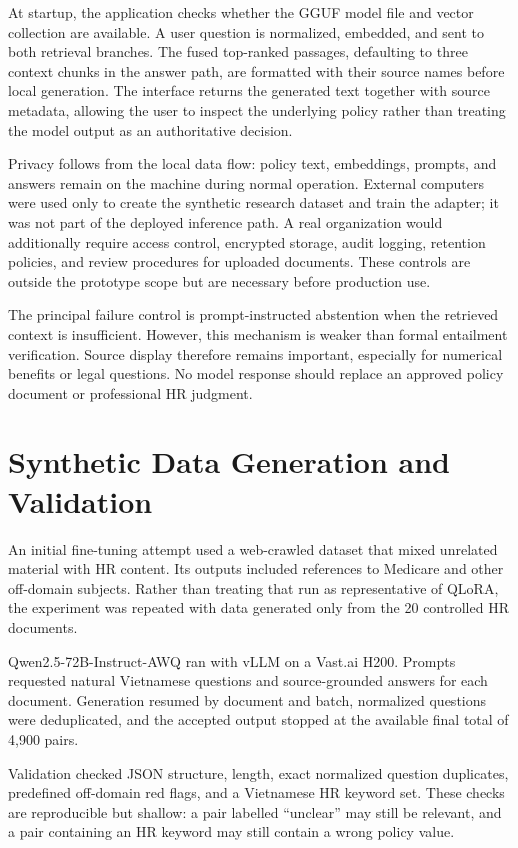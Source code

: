 \documentclass[12pt,a4paper,oneside]{report}
\begin{document}
At startup, the application checks whether the GGUF model file and vector
collection are available. A user question is normalized, embedded, and sent to
both retrieval branches. The fused top-ranked passages, defaulting to three
context chunks in the answer path, are formatted with their source names before
local generation. The interface returns the generated text together with source
metadata, allowing the user to inspect the underlying policy rather than treating
the model output as an authoritative decision.

Privacy follows from the local data flow: policy text, embeddings, prompts, and
answers remain on the machine during normal operation. External computers were
used only to create the synthetic research dataset and train the adapter; it was
not part of the deployed inference path. A real organization would additionally
require access control, encrypted storage, audit logging, retention policies,
and review procedures for uploaded documents. These controls are outside the
prototype scope but are necessary before production use.

The principal failure control is prompt-instructed abstention when the retrieved
context is insufficient. However, this mechanism is weaker than formal entailment
verification. Source display therefore remains important, especially for
numerical benefits or legal questions. No model response should replace an
approved policy document or professional HR judgment.

\section{Synthetic Data Generation and Validation}
An initial fine-tuning attempt used a web-crawled dataset that mixed unrelated
material with HR content. Its outputs included references to Medicare and other
off-domain subjects. Rather than treating that run as representative of QLoRA,
the experiment was repeated with data generated only from the 20 controlled HR
documents.

Qwen2.5-72B-Instruct-AWQ ran with vLLM on a Vast.ai H200. Prompts requested
natural Vietnamese questions and source-grounded answers for each document.
Generation resumed by document and batch, normalized questions were deduplicated,
and the accepted output stopped at the available final total of 4,900 pairs.

Validation checked JSON structure, length, exact normalized question duplicates,
predefined off-domain red flags, and a Vietnamese HR keyword set. These checks
are reproducible but shallow: a pair labelled ``unclear'' may still be relevant,
and a pair containing an HR keyword may still contain a wrong policy value.
\end{document}
